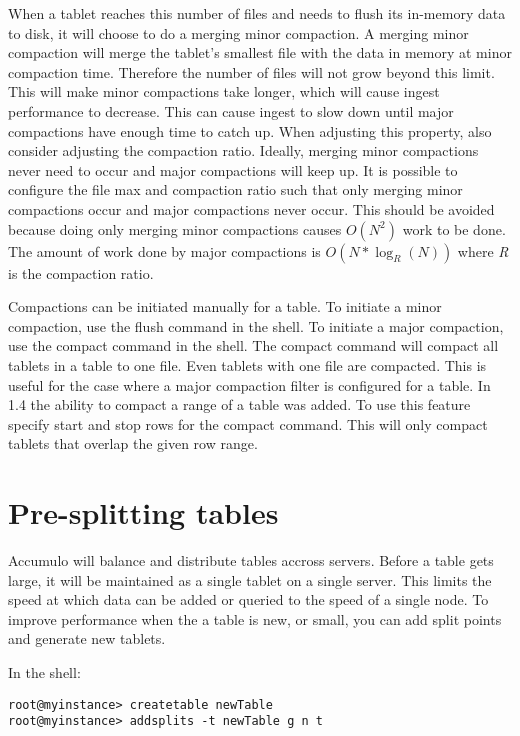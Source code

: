 When a tablet reaches this number of files and needs to flush its in-memory
data to disk, it will choose to do a merging minor compaction.  A merging minor
compaction will merge the tablet's smallest file with the data in memory at
minor compaction time.  Therefore the number of files will not grow beyond this
limit.  This will make minor compactions take longer, which will cause ingest
performance to decrease.  This can cause ingest to slow down until major
compactions have enough time to catch up.   When adjusting this property, also
consider adjusting the compaction ratio. Ideally, merging minor compactions
never need to occur and major compactions will keep up. It is possible to
configure the file max and compaction ratio such that only merging minor
compactions occur and major compactions never occur. This should be avoided
because doing only merging minor compactions causes $O(N^2)$ work to be done.
The amount of work done by major compactions is $O(N*\log_R(N))$ where
\textit{R} is the compaction ratio.

Compactions can be initiated manually for a table.  To initiate a minor
compaction, use the flush command in the shell.  To initiate a major compaction,
use the compact command in the shell.  The compact command will compact all
tablets in a table to one file.  Even tablets with one file are compacted.  This
is useful for the case where a major compaction filter is configured for a
table. In 1.4 the ability to compact a range of a table was added.  To use this
feature specify start and stop rows for the compact command.  This will only
compact tablets that overlap the given row range.

\section{Pre-splitting tables}

Accumulo will balance and distribute tables accross servers. Before a
table gets large, it will be maintained as a single tablet on a single
server.  This limits the speed at which data can be added or queried
to the speed of a single node. To improve performance when the a table
is new, or small, you can add split points and generate new tablets.

In the shell:

\small
\begin{verbatim}
root@myinstance> createtable newTable
root@myinstance> addsplits -t newTable g n t
\end{verbatim}
\normalsize


